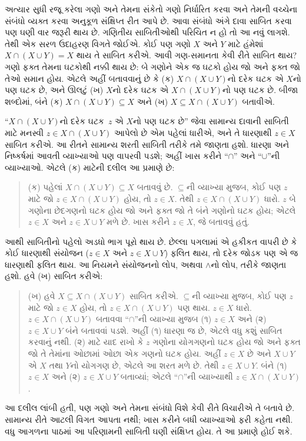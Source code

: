 \begin{explain}
અત્યાર સુધી રજૂ કરેલા ગણો અને તેમના સંકેતો ગણો નિર્ધારિત કરવા
અને તેમની વચ્ચેના સંબંધો વ્યક્ત કરવા અનુકૂળ સંક્ષિપ્ત રીત આપે છે.
આવા સંબંધો અંગે દાવા સાબિત કરવા પણ ઘણી વાર જરૂરી થાય છે.
ગણિતીય સાબિતીઓથી પરિચિત ન હો તો આ નવું લાગશે.
તેથી એક સરળ ઉદાહરણ વિગતે જોઈએ.
કોઈ પણ ગણો $X$ અને $Y$ માટે હંમેશાં
$X \cap (X \cup Y) = X$ થાય તે સાબિત કરીએ.
આવી ગણ-સમાનતા કેવી રીતે સાબિત થાય?
ગણો ફક્ત તેમના ઘટકોથી નક્કી થાય છે:
બે ગણોને એક જ ઘટકો હોય જો અને ફક્ત જો તેઓ સમાન હોય.
એટલે અહીં બતાવવાનું છે કે (ક) $X \cap (X \cup
Y)$નો દરેક ઘટક એ $X$નો પણ ઘટક છે,
અને ઊલટું (ખ) $X$નો દરેક ઘટક એ
$X \cap (X \cup Y)$નો પણ ઘટક છે.
બીજા શબ્દોમાં, બંને (ક) $X \cap (X \cup Y) \subseteq X$
અને (ખ) $X \subseteq X \cap (X \cup Y)$ બતાવીએ.

``$X \cap (X \cup Y)$નો દરેક ઘટક~$z$
એ $X$નો પણ ઘટક છે'' જેવા સામાન્ય દાવાની સાબિતી
માટે મનસ્વી $z \in X \cap (X \cup Y)$ આપેલો છે એમ
પહેલાં ધારીએ, અને તે ધારણાથી $z \in X$ સાબિત કરીએ.
આ રીતને સામાન્ય શરતી સાબિતી તરીકે તમે જાણતા હશો.
ધારણા અને નિષ્કર્ષમાં આવતી વ્યાખ્યાઓ પણ વાપરવી પડશે;
અહીં ખાસ કરીને ``$\cap$'' અને ``$\cup$''ની વ્યાખ્યાઓ.
એટલે (ક) માટેની દલીલ આ પ્રમાણે છે:

\begin{quote}
(ક) પહેલાં $X \cap (X \cup Y) \subseteq X$ બતાવવું છે.
$\subseteq$ની વ્યાખ્યા મુજબ, કોઈ પણ $z$ માટે
જો $z \in X \cap (X \cup Y)$ હોય, તો $z \in X$.
તેથી $z \in X \cap (X \cup Y)$ ધારો.
$z$ બે ગણોના છેદગણનો ઘટક હોય જો અને ફક્ત જો
તે બંને ગણોનો ઘટક હોય; એટલે $z \in X$ અને
$z \in X \cup Y$ મળે છે. ખાસ કરીને $z \in X$,
જે બતાવવું હતું.
\end{quote}

આથી સાબિતીનો પહેલો અડધો ભાગ પૂરો થાય છે.
છેલ્લા પગલામાં એ હકીકત વાપરી છે કે કોઈ ધારણાથી
સંયોજન ($z \in X$ અને $z \in X \cup Y$) ફલિત થાય,
તો દરેક જોડક પણ એ જ ધારણાથી ફલિત થાય.
આ નિયમને સંયોજનનો લોપ, અથવા $\land$નો લોપ, તરીકે જાણતા હશો.
હવે (ખ) સાબિત કરીએ:

\begin{quote}
(ખ) હવે $X \subseteq X \cap (X \cup Y)$ સાબિત કરીએ.
$\subseteq$ની વ્યાખ્યા મુજબ, કોઈ પણ $z$ માટે
જો $z \in X$ હોય, તો $z \in X \cap (X \cup Y)$ પણ થાય.
$z \in X$ ધારો. $z \in X \cap (X \cup Y)$ બતાવવા
``$\cap$''ની વ્યાખ્યા મુજબ (૧) $z \in X$ અને
(૨) $z \in X \cup Y$ બંને બતાવવાં પડશે.
અહીં (૧) ધારણા જ છે, એટલે વધુ કશું સાબિત કરવાનું નથી.
(૨) માટે યાદ રાખો કે $z$ ગણોના યોગગણનો ઘટક હોય
જો અને ફક્ત જો તે તેમાંના ઓછામાં ઓછા એક ગણનો ઘટક હોય.
અહીં $z \in X$ છે અને $X \cup Y$ એ $X$ તથા $Y$નો યોગગણ છે,
એટલે આ શરત મળે છે. તેથી $z \in X \cup Y$.
બંને (૧) $z \in X$ અને (૨) $z \in X \cup Y$ બતાવ્યાં;
એટલે ``$\cap$''ની વ્યાખ્યાથી $z \in X \cap (X \cup Y)$.
\end{quote}

આ દલીલ લાંબી હતી, પણ ગણો અને તેમના સંબંધો વિશે કેવી રીતે
વિચારીએ તે બતાવે છે. સામાન્ય રીતે આટલી વિગત આપતા નથી;
ખાસ કરીને બધી વ્યાખ્યાઓ ફરી કહેતા નથી.
વધુ આગળના પાઠમાં આ પરિણામની સાબિતી ઘણી સંક્ષિપ્ત હોય.
તે આ પ્રમાણે હોઈ શકે.
\end{explain}

